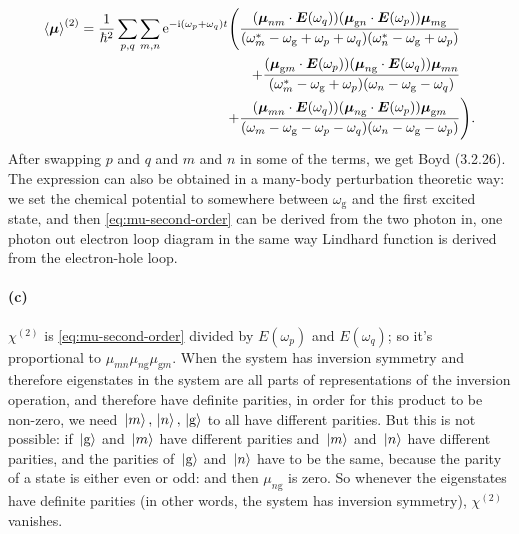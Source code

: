 \documentclass[hyperref, a4paper]{article}
\newcommand*{\ii}{\mathrm{i}}
\newcommand*{\ee}{\mathrm{e}}
\newcommand*{\omegag}{\omega_{\text{g}}}
\begin{document}
\begin{equation}
    \begin{aligned}
        \expval{\vb*{\mu}}^{(2)} = 
        \frac{1}{\hbar^2} \sum_{p, q} \sum_{m, n}
        \ee^{- \ii (\omega_p + \omega_q) t} 
        \Biggl(
            \frac{
                (\vb*{\mu}_{nm} \cdot \vb*{E}(\omega_q)) 
                (\vb*{\mu}_{\text{g} n} \cdot \vb*{E}(\omega_p)) 
                \vb*{\mu}_{m \text{g}}
            }{
                (\omega_m^* - \omegag + \omega_p + \omega_q)
                (\omega_n^* - \omegag + \omega_p)
            } & \\
            \quad +
            \frac{
                (\vb*{\mu}_{\text{g} m} \cdot \vb*{E}(\omega_p)) 
                (\vb*{\mu}_{n \text{g}} \cdot \vb*{E}(\omega_q)) 
                \vb*{\mu}_{m n} 
            }{
                (\omega_m^* - \omegag + \omega_p) 
                (\omega_n - \omegag - \omega_q)
            }& \\
            +  
            \frac{
                (\vb*{\mu}_{mn} \cdot \vb*{E}(\omega_q)) 
                (\vb*{\mu}_{n \text{g}} \cdot \vb*{E}(\omega_p))
                \vb*{\mu}_{\text{g} m}
            }{
                (\omega_m - \omegag - \omega_p - \omega_q)
                (\omega_n - \omegag - \omega_p)
            }& 
        \Biggr).
    \end{aligned}
    \label{eq:mu-second-order}
\end{equation} 
After swapping $p$ and $q$ and $m$ and $n$ in some of the terms, 
we get Boyd (3.2.26).
The expression can also be obtained in a many-body perturbation theoretic way: 
we set the chemical potential to somewhere between $\omegag$ 
and the first excited state, 
and then \eqref{eq:mu-second-order} can be derived from 
the two photon in, one photon out electron loop diagram 
in the same way Lindhard function is derived from the electron-hole loop.

\paragraph*{(c)} $\chi^{(2)}$ is \eqref{eq:mu-second-order} 
divided by $E(\omega_p)$ and $E(\omega_q)$;
so it's proportional to $\mu_{mn} \mu_{n \text{g}} \mu_{\text{g} m}$.
When the system has inversion symmetry 
and therefore eigenstates in the system are all parts of 
representations of the inversion operation, 
and therefore have definite parities,
in order for this product to be non-zero, we need $\ket*{m}, \ket*{n}, \ket*{\text{g}}$
to all have different parities.
But this is not possible: 
if $\ket*{\text{g}}$ and $\ket*{m}$ have different parities 
and $\ket*{m}$ and $\ket*{n}$ have different parities, 
and the parities of $\ket*{\text{g}}$ and $\ket*{n}$
have to be the same, because the parity of a state is either even or odd: 
and then $\mu_{n \text{g}}$ is zero.
So whenever the eigenstates have definite parities 
(in other words, the system has inversion symmetry), 
$\chi^{(2)}$ vanishes.
\end{document}
